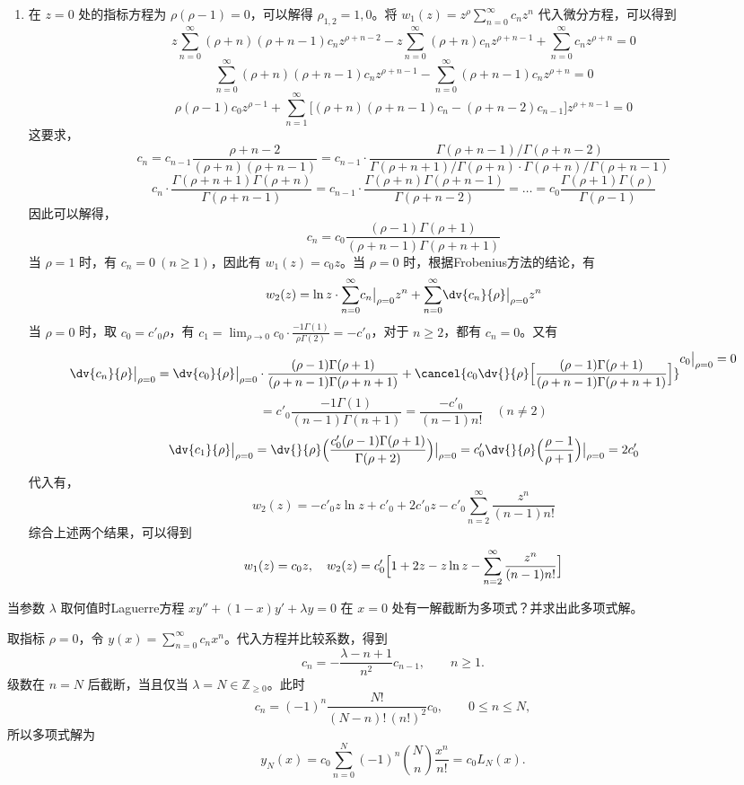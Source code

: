\begin{question}
\begin{solution}
\begin{enumerate}
  \item 在 \(z=0\) 处的指标方程为 \(\rho(\rho-1)=0\)，可以解得 \(\rho_{1,2}=1,0\)。将 \(w_1(z)=z^{\rho}\sum_{n=0}^\infty c_n z^n\) 代入微分方程，可以得到 \[ z\sum_{n=0}^\infty (\rho+n)(\rho+n-1)c_n z^{\rho+n-2}-z\sum_{n=0}^\infty (\rho+n)c_n z^{\rho+n-1}+\sum_{n=0}^\infty c_n z^{\rho+n}=0 \] \[ \sum_{n=0}^\infty (\rho+n)(\rho+n-1)c_n z^{\rho+n-1}-\sum_{n=0}^\infty (\rho+n-1)c_n z^{\rho+n}=0 \] \[ \rho(\rho-1)c_0 z^{\rho-1}+\sum_{n=1}^\infty \bigl[(\rho+n)(\rho+n-1)c_n-(\rho+n-2)c_{n-1}\bigr]z^{\rho+n-1}=0 \]这要求，\[ c_n = c_{n-1}\frac{\rho+n-2}{(\rho+n)(\rho+n-1)} = c_{n-1}\cdot\frac{\Gamma(\rho+n-1)/\Gamma(\rho+n-2)}{\Gamma(\rho+n+1)/\Gamma(\rho+n)\cdot\Gamma(\rho+n)/\Gamma(\rho+n-1)} \] \[ c_n\cdot\frac{\Gamma(\rho+n+1)\Gamma(\rho+n)}{\Gamma(\rho+n-1)} =c_{n-1}\cdot\frac{\Gamma(\rho+n)\Gamma(\rho+n-1)}{\Gamma(\rho+n-2)}=\dots =c_0\frac{\Gamma(\rho+1)\Gamma(\rho)}{\Gamma(\rho-1)} \]因此可以解得，\[ c_n = c_0\frac{(\rho-1)\Gamma(\rho+1)}{(\rho+n-1)\Gamma(\rho+n+1)} \]当 \(\rho=1\) 时，有 \(c_n=0\ (n\ge 1)\)，因此有 \(w_1(z)=c_0z\)。当 \(\rho=0\) 时，根据Frobenius方法的结论，有 \[ w_2(z)=\ln z\cdot\sum_{n=0}^\infty \bigl.c_n\bigr|_{\rho=0} z^{n}+\sum_{n=0}^\infty \bigl.\dv{c_n}{\rho}\bigr|_{\rho=0} z^{n} \]当 \(\rho=0\) 时，取 \(c_0=c'_0\rho\)，有 \(c_1=\displaystyle\lim_{\rho\to0} c_0\cdot\frac{-1\Gamma(1)}{\rho\Gamma(2)}=-c'_0\)，对于 \(n\ge 2\)，都有 \(c_n=0\)。又有 \[ \bigl.\dv{c_n}{\rho}\bigr|_{\rho=0} =\bigl.\dv{c_0}{\rho}\bigr|_{\rho=0}\cdot\frac{(\rho-1)\Gamma(\rho+1)}{(\rho+n-1)\Gamma(\rho+n+1)}+\cancel{c_0\dv{}{\rho}\Bigl[\frac{(\rho-1)\Gamma(\rho+1)}{(\rho+n-1)\Gamma(\rho+n+1)}\Bigr]}^{\displaystyle \bigl.c_0\bigr|_{\rho=0}=0} \] \[ =c'_0\frac{-1\Gamma(1)}{(n-1)\Gamma(n+1)}=\frac{-c'_0}{(n-1)n!}\quad (n\neq2) \] \[ \bigl.\dv{c_1}{\rho}\bigr|_{\rho=0} =\bigl.\dv{}{\rho}\Bigl(\frac{c'_0(\rho-1)\Gamma(\rho+1)}{\Gamma(\rho+2)}\Bigr)\bigr|_{\rho=0}=c'_0\bigl.\dv{}{\rho}\Bigl(\frac{\rho-1}{\rho+1}\Bigr)\bigr|_{\rho=0}=2c'_0 \]代入有，\[ w_2(z)=-c'_0 z\ln z+c'_0+2c'_0 z-c'_0\sum_{n=2}^\infty \frac{z^n}{(n-1)n!} \]综合上述两个结果，可以得到 \[ w_1(z)=c_0z,\quad w_2(z)=c'_0\Bigl[1+2z-z\ln z-\sum_{n=2}^\infty \frac{z^n}{(n-1)n!}\Bigr] \]
\end{enumerate}
\end{solution}
\end{question}

\begin{question}
当参数 \(\lambda\) 取何值时Laguerre方程 \(x y''+(1-x)y'+\lambda y=0\) 在 \(x=0\) 处有一解截断为多项式？并求出此多项式解。
\begin{solution}
取指标 \(\rho=0\)，令 \(y(x)=\sum_{n=0}^{\infty}c_nx^n\)。代入方程并比较系数，得到
\[
c_n=-\frac{\lambda-n+1}{n^2}c_{n-1},
\qquad n\ge1.
\]
级数在 \(n=N\) 后截断，当且仅当
\(\lambda=N\in\mathbb{Z}_{\ge0}\)。此时
\[
c_n=(-1)^n\frac{N!}{(N-n)!\,(n!)^2}c_0,
\qquad 0\le n\le N,
\]
所以多项式解为
\[
y_N(x)
=c_0\sum_{n=0}^{N}(-1)^n\binom{N}{n}\frac{x^n}{n!}
=c_0L_N(x).
\]
\end{solution}
\end{question}

